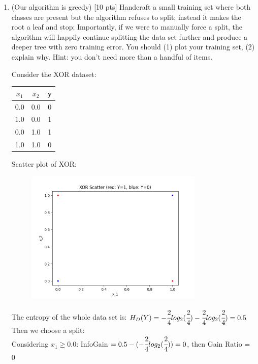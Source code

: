 \documentclass[a4paper]{article}
\theoremstyle{definition}
\newenvironment{soln}{
    \leavevmode\color{blue}\ignorespaces
}{}
\begin{document}
\begin{enumerate}
\item (Our algorithm is greedy)  [10 pts] Handcraft a small training set where both classes are present but the algorithm refuses to split; instead it makes the root a leaf and stop;
Importantly, if we were to manually force a split, the algorithm will happily continue splitting the data set further and produce a deeper tree with zero training error.
You should (1) plot your training set, (2) explain why.  Hint: you don't need more than a handful of items. \\
\begin{soln}
Consider the XOR dataset:
\begin{center}
\begin{tabular}{ |c |c| c| }
    \hline $x_1$ & $x_2$ & y \\
    \hline 0.0 & 0.0 & 0 \\ 
    \hline 1.0 & 0.0 & 1 \\  
    \hline 0.0 & 1.0 & 1 \\
    \hline 1.0 & 1.0 & 0 \\
    \hline
\end{tabular}
\end{center}
Scatter plot of XOR:
\begin{figure}[h!]
    \centering
    \includegraphics[width=0.8\textwidth]{images/XORScatter.png}  
    \captionsetup{labelformat=empty}
    \caption{}
    \label{fig:mixed}
\end{figure}
\newpage
The entropy of the whole data set is:
$ H_D(Y) = -\cfrac{2}{4}log_2(\cfrac{2}{4}) - \cfrac{2}{4}log_2(\cfrac{2}{4}) = 0.5$ \\
Then we choose a split: \\
Considering $x_1 \geq 0.0$: InfoGain $= 0.5 - (-\cfrac{2}{4}log_2(\cfrac{2}{4})) = 0 $, then Gain Ratio = 0  \\

\end{soln}
\end{enumerate}
\end{document}
